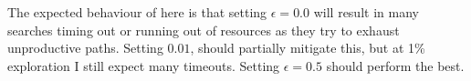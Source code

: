 \documentclass{article}
\theoremstyle{definition}
\begin{document}
The expected behaviour of here is that setting $\epsilon=0.0$ will result in many searches timing out or running out of resources as they try to exhaust unproductive paths. Setting $0.01$, should partially mitigate this, but at 1\% exploration I still expect many timeouts. Setting $\epsilon=0.5$ should perform the best.
\end{document}

